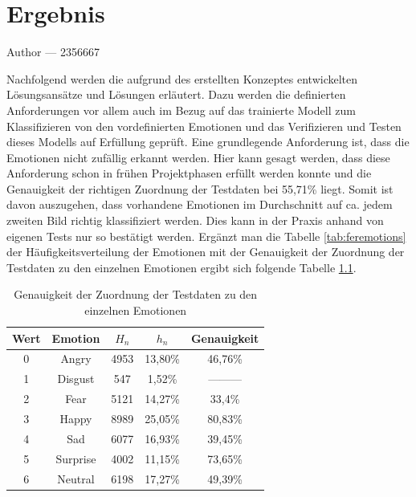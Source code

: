 \documentclass[12pt, a4paper]{report}
\makeatletter
\newcommand{\chapterauthor}[1]{%
  {\parindent0pt\vspace*{-25pt}%
  \large{Author --- }
  \linespread{1.1}\large\scshape#1%
  \par\nobreak\vspace*{35pt} }
  \@afterheading%
}
\makeatother
\begin{document}
\chapter{Ergebnis}
\chapterauthor{2356667}
Nachfolgend werden die aufgrund des erstellten Konzeptes entwickelten Lösungsansätze und Lösungen erläutert. Dazu werden die definierten Anforderungen vor allem auch im Bezug auf das trainierte Modell zum Klassifizieren von den vordefinierten Emotionen und das Verifizieren und Testen dieses Modells auf Erfüllung geprüft.\newline
Eine grundlegende Anforderung ist, dass die Emotionen nicht zufällig erkannt werden. Hier kann gesagt werden, dass diese Anforderung schon in frühen Projektphasen erfüllt werden konnte und die Genauigkeit der richtigen Zuordnung der Testdaten bei 55,71\% liegt. Somit ist davon auszugehen, dass vorhandene Emotionen im Durchschnitt auf ca. jedem zweiten Bild richtig klassifiziert werden. Dies kann in der Praxis anhand von eigenen Tests nur so bestätigt werden. Ergänzt man die Tabelle \ref{tab:feremotions} der Häufigkeitsverteilung der Emotionen mit der Genauigkeit der Zuordnung der Testdaten zu den einzelnen Emotionen ergibt sich folgende Tabelle \ref{tab:genauigkeitemotions}.
\begin{table}[H]
  \centering
  \begin{tabular}[H]{c|c|c|c|c}
  Wert & Emotion & $H_n$ & $h_n$ & Genauigkeit \\
  \hline
  0 & Angry & 4953 & 13,80\% & 46,76\% \\
  1 & Disgust & 547 & 1,52\% & --------- \\
  2 & Fear & 5121 & 14,27\% & 33,4\% \\
  3 & Happy & 8989 & 25,05\% & 80,83\% \\
  4 & Sad & 6077 & 16,93\% & 39,45\% \\
  5 & Surprise & 4002 & 11,15\% & 73,65\% \\
  6 & Neutral & 6198 & 17,27\% & 49,39\% \\
  \hline
  \end{tabular}
  \caption{Genauigkeit der Zuordnung der Testdaten zu den einzelnen Emotionen}
  \label{tab:genauigkeitemotions}
\end{table} 
\end{document}
